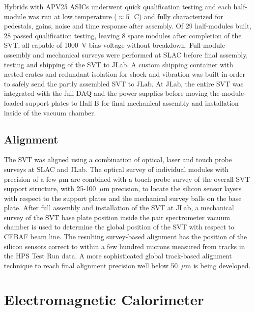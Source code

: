\documentclass[final,3p,times,twocolumn]{elsarticle}
\begin{document}
Hybrids with APV25 ASICs underwent quick qualification testing and each half-module was run at low 
temperature ($\approx5^{\circ}$ C) and fully characterized for pedestals, gains, noise and time response 
after assembly.  Of 29 half-modules built, 28 passed qualification testing, leaving 8 spare modules after 
completion of the SVT, all capable of 1000~V bias voltage without breakdown.  Full-module assembly 
and mechanical surveys were performed at SLAC before final assembly, testing and shipping of the 
SVT to JLab. A custom shipping container with nested crates and redundant isolation for shock and 
vibration was built in order to safely send the partly assembled SVT to JLab. At JLab, the entire SVT was 
integrated with the full DAQ and the power supplies before moving the module-loaded support plates to 
Hall B for final mechanical assembly and installation inside of the vacuum chamber.

\subsection{Alignment}
The SVT was aligned using a combination of optical, laser and touch probe surveys at SLAC and JLab. 
The optical survey of individual modules with precision of a few $\mu$m are combined with a 
touch-probe survey of the overall SVT support structure, with 25-100~$\mu$m precision, to locate the 
silicon sensor layers with respect to the support plates and the mechanical survey balls on the base 
plate. After full assembly and installation of the SVT at JLab, a mechanical survey of the SVT base plate 
position inside the pair spectrometer vacuum chamber is used to determine the global position of the 
SVT with respect to CEBAF beam line. The resulting survey-based alignment has the position of the 
silicon sensors correct to within a few hundred microns measured from tracks in the HPS Test Run 
data. A more sophisticated global track-based alignment technique to reach final alignment precision 
well below 50~$\mu$m is being developed.




\section{Electromagnetic Calorimeter}
\label{sec:ecal}
\end{document}
